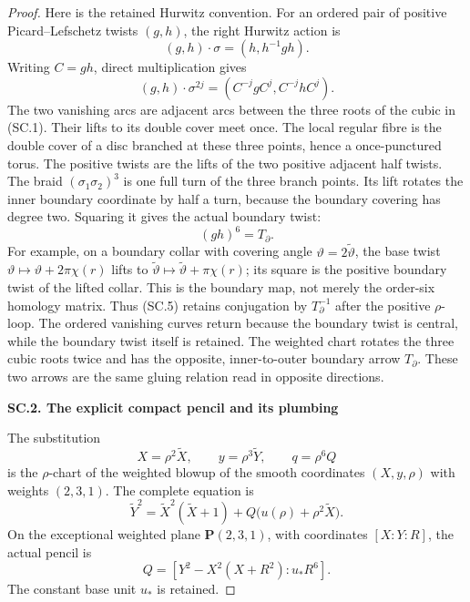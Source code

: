 \begin{proof}
Here is the retained Hurwitz convention. For an ordered pair of positive
Picard--Lefschetz twists \((g,h)\), the right Hurwitz action is
\[
 (g,h)\cdot\sigma=(h,h^{-1}gh).
\]
Writing \(C=gh\), direct multiplication gives
\[
 (g,h)\cdot\sigma^{2j}
       =(C^{-j}gC^j,C^{-j}hC^j).                    \tag{SC.5}
\]
The two vanishing arcs are adjacent arcs between the three roots of the
cubic in (SC.1). Their lifts to its double cover meet once. The local
regular fibre is the double cover of a disc branched at these three
points, hence a once-punctured torus. The positive twists are the lifts
of the two positive adjacent half twists. The braid
\((\sigma_1\sigma_2)^3\) is one full turn of the three branch points.
Its lift rotates the inner boundary coordinate by half a turn, because
the boundary covering has degree two. Squaring it gives the actual
boundary twist:
\[
                        (gh)^6=T_{\partial}.        \tag{SC.6}
\]
For example, on a boundary collar with covering angle
\(\vartheta=2\widetilde\vartheta\), the base twist
\(\vartheta\mapsto\vartheta+2\pi\chi(r)\) lifts to
\(\widetilde\vartheta\mapsto\widetilde\vartheta+\pi\chi(r)\);
its square is the positive boundary twist of the lifted collar.
This is the boundary map, not merely the order-six homology matrix.
Thus (SC.5) retains conjugation by \(T_{\partial}^{-1}\) after the
positive \(\rho\)-loop. The ordered vanishing curves return because the
boundary twist is central, while the boundary twist itself is retained.
The weighted chart rotates the three cubic roots twice and has the
opposite, inner-to-outer boundary arrow \(T_{\partial}\). These two
arrows are the same gluing relation read in opposite directions.

\par

\medskip\noindent\textbf{SC.2. The explicit compact pencil and its plumbing}

\par\nobreak

The substitution
\[
 X=\rho^2\widetilde X,\qquad
 y=\rho^3\widetilde Y,\qquad q=\rho^6Q
\]
is the \(\rho\)-chart of the weighted blowup of the smooth coordinates
\((X,y,\rho)\) with weights \((2,3,1)\). The complete equation is
\[
 \widetilde Y^2=\widetilde X^2(\widetilde X+1)
                    +Q\bigl(u(\rho)+\rho^2\widetilde X\bigr).
                                                               \tag{SC.7}
\]
On the exceptional weighted plane \(\mathbf P(2,3,1)\), with coordinates
\([X:Y:R]\), the actual pencil is
\[
 Q=[Y^2-X^2(X+R^2):u_*R^6].                          \tag{SC.8}
\]
The constant base unit \(u_*\) is retained.


\end{proof}
